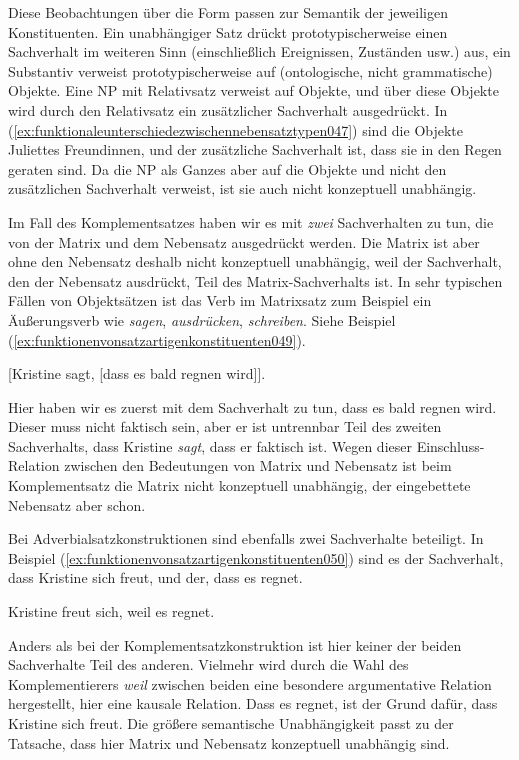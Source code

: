 Diese Beobachtungen über die Form passen zur Semantik der jeweiligen Konstituenten.
Ein unabhängiger Satz drückt prototypischerweise einen Sachverhalt im weiteren Sinn (einschließlich Ereignissen, Zuständen usw.) aus, ein Substantiv verweist prototypischerweise auf (ontologische, nicht grammatische) Objekte.
Eine NP mit Relativsatz verweist auf Objekte, und über diese Objekte wird durch den Relativsatz ein zusätzlicher Sachverhalt ausgedrückt.
In (\ref{ex:funktionaleunterschiedezwischennebensatztypen047}) sind die Objekte Juliettes Freundinnen, und der zusätzliche Sachverhalt ist, dass sie in den Regen geraten sind.
Da die NP als Ganzes aber auf die Objekte und nicht den zusätzlichen Sachverhalt verweist, ist sie auch nicht konzeptuell unabhängig.

Im Fall des Komplementsatzes haben wir es mit \textit{zwei} Sachverhalten zu tun, die von der Matrix und dem Nebensatz ausgedrückt werden.
Die Matrix ist aber ohne den Nebensatz deshalb nicht konzeptuell unabhängig, weil der Sachverhalt, den der Nebensatz ausdrückt, Teil des Matrix-Sachverhalts ist.
In sehr typischen Fällen von Objektsätzen ist das Verb im Matrixsatz zum Beispiel ein Äußerungsverb wie \textit{sagen}, \textit{ausdrücken}, \textit{schreiben}.
Siehe Beispiel (\ref{ex:funktionenvonsatzartigenkonstituenten049}).

\begin{exe}
  \ex\label{ex:funktionenvonsatzartigenkonstituenten049} [Kristine sagt, [dass es bald regnen wird]].
\end{exe}

Hier haben wir es zuerst mit dem Sachverhalt zu tun, dass es bald regnen wird.
Dieser muss nicht faktisch sein, aber er ist untrennbar Teil des zweiten Sachverhalts, dass Kristine \textit{sagt}, dass er faktisch ist. 
Wegen dieser Einschluss-Relation zwischen den Bedeutungen von Matrix und Nebensatz ist beim Komplementsatz die Matrix nicht konzeptuell unabhängig, der eingebettete Nebensatz aber schon.

Bei Adverbialsatzkonstruktionen sind ebenfalls zwei Sachverhalte beteiligt.
In Beispiel (\ref{ex:funktionenvonsatzartigenkonstituenten050}) sind es der Sachverhalt, dass Kristine sich freut, und der, dass es regnet.

\begin{exe}
  \ex\label{ex:funktionenvonsatzartigenkonstituenten050} Kristine freut sich, weil es regnet.
\end{exe}

Anders als bei der Komplementsatzkonstruktion ist hier keiner der beiden Sachverhalte Teil des anderen.
Vielmehr wird durch die Wahl des Komplementierers \textit{weil} zwischen beiden eine besondere argumentative Relation hergestellt, hier eine kausale Relation.
Dass es regnet, ist der Grund dafür, dass Kristine sich freut.
Die größere semantische Unabhängigkeit passt zu der Tatsache, dass hier Matrix und Nebensatz konzeptuell unabhängig sind.

